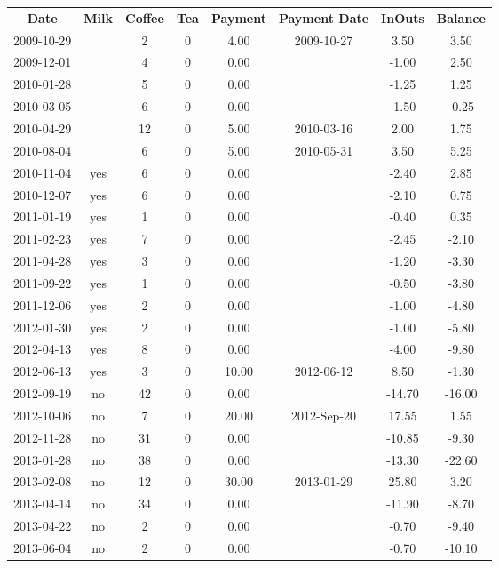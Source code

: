 \begin{center}
\begin{tabular}{cccccccc}
\textbf{Date} & \textbf{Milk} & \textbf{Coffee} & \textbf{Tea} & \textbf{Payment} & \textbf{Payment Date} & \textbf{InOuts} & \textbf{Balance} \\
2009-10-29 &  &  2 & 0 &  4.00 & 2009-10-27 &   3.50 &   3.50\\ 
2009-12-01 &  &  4 & 0 &  0.00 &  &  -1.00 &   2.50\\ 
2010-01-28 &  &  5 & 0 &  0.00 &  &  -1.25 &   1.25\\ 
2010-03-05 &  &  6 & 0 &  0.00 &  &  -1.50 &  -0.25\\ 
2010-04-29 &  & 12 & 0 &  5.00 & 2010-03-16 &   2.00 &   1.75\\ 
2010-08-04 &  &  6 & 0 &  5.00 & 2010-05-31 &   3.50 &   5.25\\ 
2010-11-04 & yes &  6 & 0 &  0.00 &  &  -2.40 &   2.85\\ 
2010-12-07 & yes &  6 & 0 &  0.00 &  &  -2.10 &   0.75\\ 
2011-01-19 & yes &  1 & 0 &  0.00 &  &  -0.40 &   0.35\\ 
2011-02-23 & yes &  7 & 0 &  0.00 &  &  -2.45 &  -2.10\\ 
2011-04-28 & yes &  3 & 0 &  0.00 &  &  -1.20 &  -3.30\\ 
2011-09-22 & yes &  1 & 0 &  0.00 &  &  -0.50 &  -3.80\\ 
2011-12-06 & yes &  2 & 0 &  0.00 &  &  -1.00 &  -4.80\\ 
2012-01-30 & yes &  2 & 0 &  0.00 &  &  -1.00 &  -5.80\\ 
2012-04-13 & yes &  8 & 0 &  0.00 &  &  -4.00 &  -9.80\\ 
2012-06-13 & yes &  3 & 0 & 10.00 & 2012-06-12 &   8.50 &  -1.30\\ 
2012-09-19 & no & 42 & 0 &  0.00 &  & -14.70 & -16.00\\ 
2012-10-06 & no &  7 & 0 & 20.00 & 2012-Sep-20 &  17.55 &   1.55\\ 
2012-11-28 & no & 31 & 0 &  0.00 &  & -10.85 &  -9.30\\ 
2013-01-28 & no & 38 & 0 &  0.00 &  & -13.30 & -22.60\\ 
2013-02-08 & no & 12 & 0 & 30.00 & 2013-01-29 &  25.80 &   3.20\\ 
2013-04-14 & no & 34 & 0 &  0.00 &  & -11.90 &  -8.70\\ 
2013-04-22 & no &  2 & 0 &  0.00 &  &  -0.70 &  -9.40\\ 
2013-06-04 & no &  2 & 0 &  0.00 &  &  -0.70 & -10.10
\end{tabular}
\end{center}

